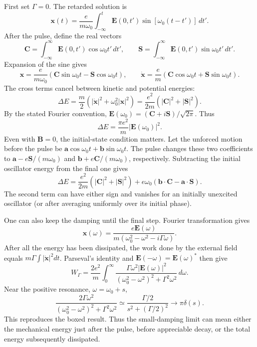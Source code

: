 First set $\Gamma=0$. The retarded solution is
\[
 \mathbf x(t)=\frac{e}{m\omega_0}
   \int_{-\infty}^t\mathbf E(0,t')\sin[\omega_0(t-t')]\,dt'.
\]
After the pulse, define the real vectors
\[
 \mathbf C=\int_{-\infty}^{\infty}\mathbf E(0,t')\cos\omega_0t'\,dt',
 \qquad
 \mathbf S=\int_{-\infty}^{\infty}\mathbf E(0,t')\sin\omega_0t'\,dt'.
\]
Expansion of the sine gives
\[
 \mathbf x=\frac{e}{m\omega_0}
       (\mathbf C\sin\omega_0t-\mathbf S\cos\omega_0t),
 \qquad
 \dot{\mathbf x}=\frac{e}{m}
       (\mathbf C\cos\omega_0t+\mathbf S\sin\omega_0t).
\]
The cross terms cancel between kinetic and potential energies:
\[
 \Delta E=\frac m2
  \left(|\dot{\mathbf x}|^2+\omega_0^2|\mathbf x|^2\right)
 =\frac{e^2}{2m}(|\mathbf C|^2+|\mathbf S|^2).
\]
By the stated Fourier convention,
$\mathbf E(\omega_0)=(\mathbf C+i\mathbf S)/\sqrt{2\pi}$. Thus
\[
 \boxed{\Delta E=\frac{\pi e^2}{m}|\mathbf E(\omega_0)|^2.}
\]
Even with $\mathbf B=0$, the initial-state condition matters. Let the
unforced motion before the pulse be $\mathbf a\cos\omega_0t+\mathbf b\sin\omega_0t$.
The pulse changes these two coefficients to
$\mathbf a-e\mathbf S/(m\omega_0)$ and
$\mathbf b+e\mathbf C/(m\omega_0)$, respectively. Subtracting the
initial oscillator energy from the final one gives
\[
\Delta E=\frac{e^2}{2m}(|\mathbf C|^2+|\mathbf S|^2)
+e\omega_0(\mathbf b\cdot\mathbf C-\mathbf a\cdot\mathbf S).
\]
The second term can have either sign and vanishes for an initially
unexcited oscillator (or after averaging uniformly over its initial phase).

One can also keep the damping until the final step. Fourier transformation
gives
\[
 \mathbf x(\omega)=
 \frac{e\mathbf E(\omega)}
 {m(\omega_0^2-\omega^2-i\Gamma\omega)}.
\]
After all the energy has been dissipated, the work done by the external
field equals $m\Gamma\int|\dot{\mathbf x}|^2dt$. Parseval's identity and
$\mathbf E(-\omega)=\mathbf E(\omega)^*$ then give
\[
 W_\Gamma=\frac{2e^2}{m}\int_0^\infty
 \frac{\Gamma\omega^2|\mathbf E(\omega)|^2}
 {(\omega_0^2-\omega^2)^2+\Gamma^2\omega^2}\,d\omega.
\]
Near the positive resonance, $\omega=\omega_0+s$,
\[
 \frac{2\Gamma\omega^2}
 {(\omega_0^2-\omega^2)^2+\Gamma^2\omega^2}
 \simeq\frac{\Gamma/2}{s^2+(\Gamma/2)^2}
 \longrightarrow\pi\delta(s).
\]
This reproduces the boxed result. Thus the small-damping limit can mean
either the mechanical energy just after the pulse, before appreciable
decay, or the total energy subsequently dissipated.









